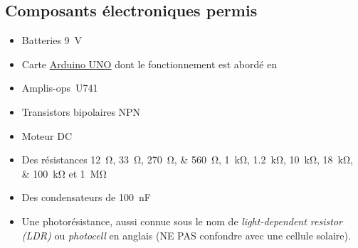 \documentclass[english,french,12pt]{article}
\begin{document}
\subsection*{\color{red}Composants électroniques permis} 
\begin{itemize}
    \item Batteries \SI{9}{\volt}
    \item Carte \href{https://www.arduino.cc/en/Guide/ArduinoUno}{Arduino UNO} dont le fonctionnement est abordé en 
    \item Amplis-ops~U741
    \item Transistors bipolaires NPN
    \item Moteur DC
    \item Des résistances \SIlist[list-final-separator = {, }]{12;33;270;560}{\ohm}, \SIlist[list-final-separator = {, }]{1;1.2;10; 18;100}{\kilo\ohm} et \SI{1}{\mega\ohm}
    \item Des condensateurs de \SI{100}{\nano\farad}
    \item Une photorésistance, aussi connue sous le nom de \textit{light-dependent resistor (LDR)} ou \textit{photocell} en anglais (NE PAS confondre avec une cellule solaire).
\end{itemize}
\vspace{-1em}
\end{document}
